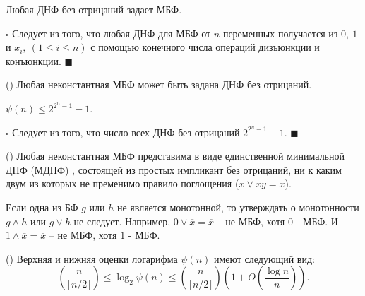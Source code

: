   \begin{Corollary}
    Любая ДНФ без отрицаний задает МБФ.
  \end{Corollary}
    $\square$
    Следует из того, что любая ДНФ для МБФ от $n$ переменных получается из $0,\ 1$ и $x_i,\ (1 \leq i \leq n)$
    с помощью конечного числа операций дизъюнкции и конъюнкции.
    $\blacksquare$
  \begin{Corollary}
    (\cite{Moschenski-2001}) Любая неконстантная МБФ может быть задана ДНФ без отрицаний.
  \end{Corollary}
   \begin{Corollary}
    $\psi(n) \leq 2^{2^n-1}-1$.
  \end{Corollary}
   $\square$
    Следует из того, что число всех ДНФ без отрицаний $2^{2^n-1}-1$.
    $\blacksquare$
  \begin{Corollary}
    (\cite{MDNF})
    Любая неконстантная МБФ представима в виде единственной
    минимальной ДНФ (МДНФ) , состоящей из простых импликант без отрицаний, 
    ни к каким двум из которых не пременимо правило поглощения 
    ($x \vee xy = x$).
  \end{Corollary}
  \begin{Remark}
    Если одна из БФ $g$ или $h$ не является монотонной, то утверждать о монотонности 
    $g \wedge h$ или $g \vee h$ не следует.
    Например, $0 \vee \overline{x} = \overline{x}$ -- не МБФ, хотя $0$ - МБФ.
    И $1 \wedge \overline{x} = \overline{x}$ -- не МБФ, хотя $1$ - МБФ.
   \end{Remark}
   \begin{Theorem}(\cite{Dedekind_Number_Asymptotics, Kleitman_Markowsky})
    Верхняя и нижняя оценки логарифма $\psi(n)$ имеют следующий вид:
    $${n\choose \lfloor n/2\rfloor}\le \log_2 \psi(n)\le {n\choose \lfloor n/2\rfloor}\left(1+O\left(\frac{\log n}{n}\right)\right).$$
   \end{Theorem}


